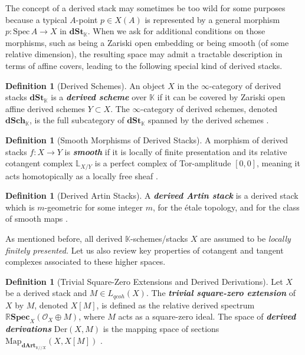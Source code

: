 \documentclass[reqno]{amsart}
\theoremstyle{definition}
\newtheorem{definition}[theorem]{Definition}
\theoremstyle{remark}
\newcommand{\LL}{\mathbb{L}}
\newcommand{\cO}{\mathcal{O}}
\newcommand{\K}{\mathbb{K}}
\newcommand{\Spec}{\mathrm{Spec\,}}
\newcommand{\dArt}{\mathbf{dArt}}
\newcommand{\bfem}[1]{\textbf{\textit{#1}}}
\begin{document}
The concept of a derived stack may sometimes be too wild for some purposes because a typical $A$-point $p\in X(A)$ is represented by a general morphism $p: \Spec A \to X$ in $\mathbf{dSt}_\K$. When we ask for additional conditions on those morphisms, such as being a Zariski open embedding or being smooth (of some relative dimension), the resulting space may admit a tractable description in terms of affine covers, leading to the following special kind of derived stacks.

\begin{definition}[Derived Schemes]
  \label{def:derived_schemes}
  An object $X$ in the $\infty$-category of derived stacks $\mathbf{dSt}_\K$ is a \bfem{derived scheme} over $\K$ if it can be covered by Zariski open affine derived schemes $Y \subset X$. The $\infty$-category of derived schemes, denoted $\mathbf{dSch}_\K$, is the full subcategory of $\mathbf{dSt}_\K$ spanned by the derived schemes \cite[Definition 2.2]{Berktav2}.
\end{definition}

\begin{definition}[Smooth Morphisms of Derived Stacks]
  A morphism of derived stacks $f: X \to Y$ is \bfem{smooth} if it
  is locally of finite presentation and its relative cotangent
  complex $\LL_{X/Y}$ is a perfect complex of Tor-amplitude $[0, 0]$,
  meaning it acts homotopically as a locally free sheaf
  \cite[Section 2.2.5]{HAG-II}.
\end{definition}

\begin{definition}[Derived Artin Stacks]
  A \bfem{derived Artin stack} is a derived stack
  which is $m$-geometric for some integer $m$, for the \'{e}tale
  topology, and for the class of smooth maps \cite[Definition
  1.3.1]{PTVV}. 
\end{definition}
As mentioned before, all derived $ \K $-schemes/stacks $ {X} $ are assumed to be  \textit{locally finitely presented.} Let us also review key properties of cotangent and tangent complexes associated to these higher spaces.
\begin{definition}[Trivial Square-Zero Extensions and Derived Derivations]
  Let $X$ be a derived stack and $M \in L_{qcoh}(X)$. The
  \bfem{trivial square-zero extension} of $X$ by $M$, denoted
  $X[M]$, is defined as the relative derived spectrum
  $\mathbb{R}\mathbf{Spec}_X(\cO_X \oplus M)$, where $M$ acts as a
  square-zero ideal. The space of \bfem{derived derivations}
  $\mathrm{Der}(X, M)$ is the mapping space of sections
  $\mathrm{Map}_{\dArt_{\K // X}}(X, X[M])$ \cite[Section 1.3.1]{CPTVV}.
\end{definition}
\end{document}
